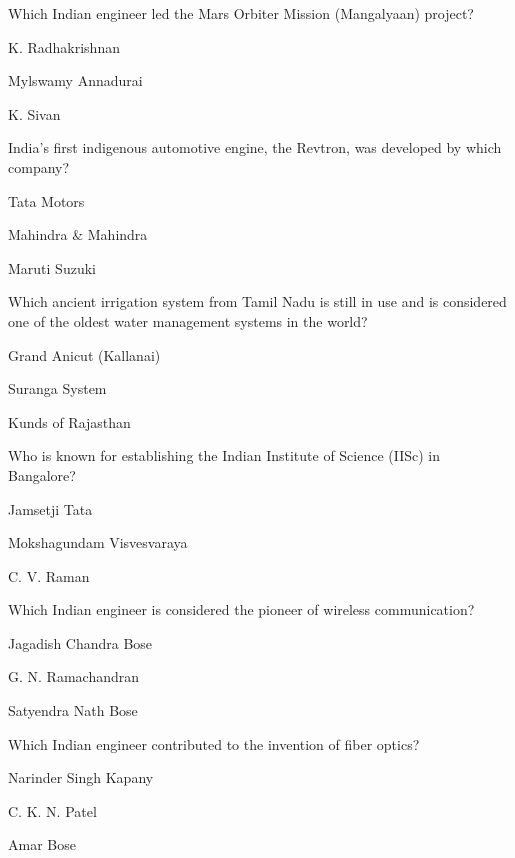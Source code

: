 \begin{enhancedmcq}{Which Indian engineer led the Mars Orbiter Mission (Mangalyaan) project?}
\item K. Radhakrishnan
\item Mylswamy Annadurai
\item K. Sivan

\end{enhancedmcq}
\begin{enhancedmcq}{India's first indigenous automotive engine, the Revtron, was developed by which company?}
\item Tata Motors
\item Mahindra & Mahindra
\item Maruti Suzuki

\end{enhancedmcq}
\begin{enhancedmcq}{Which ancient irrigation system from Tamil Nadu is still in use and is considered one of the oldest water management systems in the world?}
\item Grand Anicut (Kallanai)
\item Suranga System
\item Kunds of Rajasthan

\end{enhancedmcq}
\begin{enhancedmcq}{Who is known for establishing the Indian Institute of Science (IISc) in Bangalore?}
\item Jamsetji Tata
\item Mokshagundam Visvesvaraya
\item C. V. Raman

\end{enhancedmcq}
\begin{enhancedmcq}{Which Indian engineer is considered the pioneer of wireless communication?}
\item Jagadish Chandra Bose
\item G. N. Ramachandran
\item Satyendra Nath Bose

\end{enhancedmcq}
\begin{enhancedmcq}{Which Indian engineer contributed to the invention of fiber optics?}
\item Narinder Singh Kapany
\item C. K. N. Patel
\item Amar Bose

\end{enhancedmcq}
